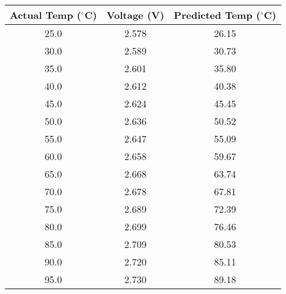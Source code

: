 \begin{tabular}{|c|c|c|}
    \hline
    \textbf{Actual Temp ($^{\circ}$C)} & \textbf{Voltage (V)} & \textbf{Predicted Temp ($^{\circ}$C)} \\
    \hline
    25.0 & 2.578 & 26.15 \\
    30.0 & 2.589 & 30.73 \\
    35.0 & 2.601 & 35.80 \\
    40.0 & 2.612 & 40.38 \\
    45.0 & 2.624 & 45.45 \\
    50.0 & 2.636 & 50.52 \\
    55.0 & 2.647 & 55.09 \\
    60.0 & 2.658 & 59.67 \\
    65.0 & 2.668 & 63.74 \\
    70.0 & 2.678 & 67.81 \\
    75.0 & 2.689 & 72.39 \\
    80.0 & 2.699 & 76.46 \\
    85.0 & 2.709 & 80.53 \\
    90.0 & 2.720 & 85.11 \\
    95.0 & 2.730 & 89.18 \\
    \hline
\end{tabular}